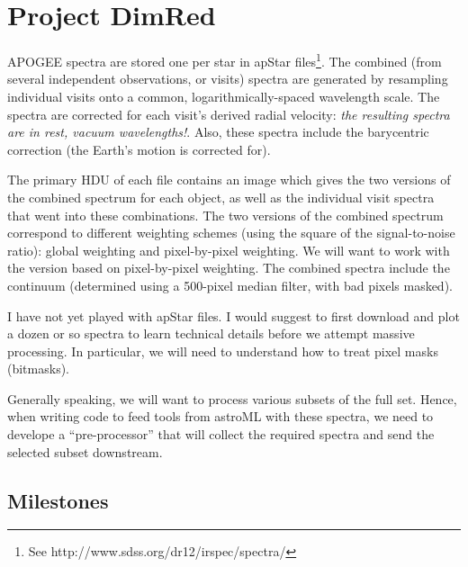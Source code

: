 \documentclass[12pt,preprint]{aastex}
\begin{document}
\section{Project DimRed} 

APOGEE spectra are stored one per star in apStar files\footnote{See http://www.sdss.org/dr12/irspec/spectra/}. 
The combined (from several independent observations, or visits) spectra are generated by resampling individual visits 
onto a common, logarithmically-spaced wavelength scale. The spectra are corrected for each visit’s derived radial 
velocity: {\it the resulting spectra are in rest, vacuum wavelengths!}. Also, these spectra include the barycentric 
correction (the Earth's motion is corrected for). 

The primary HDU of each file contains an 
image which gives the two versions of the combined spectrum for each object, as well as the individual visit 
spectra that went into these combinations. The two versions of the combined spectrum correspond to different 
weighting schemes (using the square of the signal-to-noise ratio): global weighting and pixel-by-pixel weighting.
We will want to work with the version based on pixel-by-pixel weighting. The combined spectra include the
continuum (determined using a 500-pixel median filter, with bad pixels masked).

I have not yet played with apStar files. I would suggest to first download and plot a dozen or so spectra 
to learn technical details before we attempt massive processing. In particular, we will need to understand how
to treat pixel masks (bitmasks). 

Generally speaking, we will want to process various subsets of the full set. Hence, when writing code 
to feed tools from astroML with these spectra, we need to develope a ``pre-processor'' that will collect
the required spectra and send the selected subset downstream. 


\subsection{Milestones}
\end{document}
